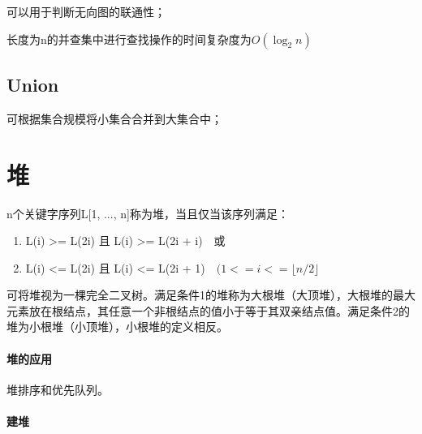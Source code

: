可以用于判断无向图的联通性；

长度为n的并查集中进行查找操作的时间复杂度为\(O(\log_2n)\)

\subsection{Union}

可根据集合规模将小集合合并到大集合中；


\section{堆}\label{堆}
n个关键字序列L[1, ..., n]称为堆，当且仅当该序列满足：
\begin{enumerate}
    \item L(i) >= L(2i) 且 L(i) >= L(2i + i)\ \ 或
    \item L(i) <= L(2i) 且 L(i) <= L(2i + 1)\ \ \((1 <= i <= \lfloor n / 2\rfloor\)
\end{enumerate}

可将堆视为一棵完全二叉树。满足条件1的堆称为大根堆（大顶堆），大根堆的最大元素放在根结点，其任意一个非根结点的值小于等于其双亲结点值。满足条件2的堆为小根堆（小顶堆），小根堆的定义相反。

\paragraph{堆的应用}
堆排序和优先队列。

\paragraph{建堆}




